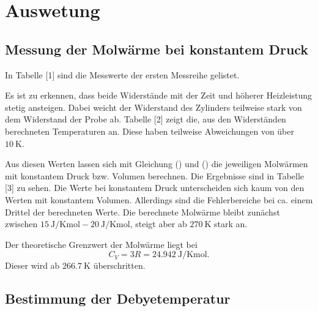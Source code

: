 \section{Auswetung}
\subsection{Messung der Molwärme bei konstantem Druck}
In Tabelle [1] sind die Messwerte der ersten Messreihe gelistet.

Es ist zu erkennen, dass beide Widerstände mit der Zeit und höherer Heizleistung
stetig ansteigen. Dabei weicht der Widerstand des Zylinders teilweise stark von dem
Widerstand der Probe ab.
Tabelle [2] zeigt die, aus den Widerständen berechneten Temperaturen an. Diese haben teilweise
Abweichungen von über $\SI{10}{\kelvin}$.

Aus diesen Werten lassen sich mit Gleichung () und () die jeweiligen Molwärmen mit
konstantem Druck bzw. Volumen berechnen. Die Ergebnisse sind in Tabelle [3] zu sehen.
Die Werte bei konstantem Druck unterscheiden sich kaum von den Werten mit konstantem Volumen.
Allerdings sind die Fehlerbereiche bei ca. einem Drittel der berechneten Werte.
Die berechnete Molwärme bleibt zunächst zwischen $\SI{15}{\joule\per\kelvin\mol} - \SI{20}{\joule\per\kelvin\mol}$, steigt aber
ab $\SI{270}{\kelvin}$ stark an.

Der theoretische Grenzwert der Molwärme liegt bei
\begin{equation}
  C_V = 3R = \SI{24,942}{\joule\per\kelvin\mol}.
\end{equation}
Dieser wird ab $\SI{266,7}{\kelvin}$ überschritten.


\subsection{Bestimmung der Debyetemperatur}

